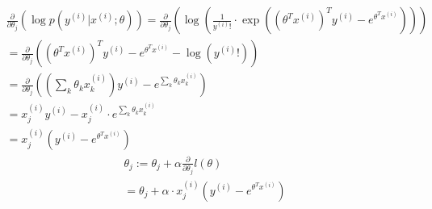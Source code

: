 \begin{answer}
\begin{eqnarray*}
\frac{\partial}{\partial\theta_{j}}\left(\log p(y^{(i)} | x^{(i)}; \theta)\right)=\frac{\partial}{\partial\theta_{j}}\left(\log\left(\frac{1}{y^{(i)}!}\cdot\exp\left((\theta^{T}x^{(i)})^{T}y^{(i)}-e^{\theta^{T}x^{(i)}}\right)\right)\right)\\
=\frac{\partial}{\partial\theta_{j}}\left((\theta^{T}x^{(i)})^{T}y^{(i)}-e^{\theta^{T}x^{(i)}}-\log(y^{(i)}!)\right)\\
=\frac{\partial}{\partial\theta_{j}}\left(\left(\sum_{k}\theta_{k}x_{k}^{(i)}\right)y^{(i)}-e^{\sum_{k}\theta_{k}x_{k}^{(i)}}\right)\\
=x_{j}^{(i)}y^{(i)}-x_{j}^{(i)}\cdot e^{\sum_{k}\theta_{k}x_{k}^{(i)}}\\
=x_{j}^{(i)}(y^{(i)}-e^{\theta^{T}x^{(i)}}) 
\end{eqnarray*}
\begin{eqnarray*}
\theta_{j}:=\theta_{j}+\alpha\frac{\partial}{\partial\theta_{j}}l(\theta)\\
=\theta_{j}+\alpha\cdot x_{j}^{(i)}(y^{(i)}-e^{\theta^{T}x^{(i)}}) 
\end{eqnarray*}
\end{answer}
